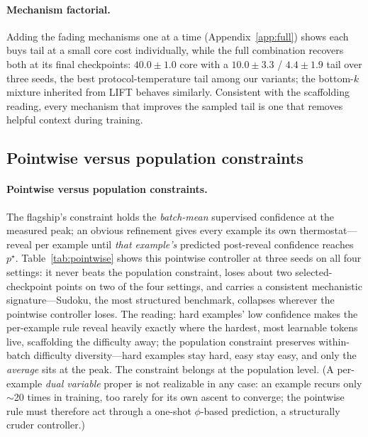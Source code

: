 \documentclass{article} %
\begin{document}
\paragraph{Mechanism factorial.} Adding the fading mechanisms one at a time (Appendix~\ref{app:full}) shows each buys tail at a small core cost individually, while the full combination recovers both at its final checkpoints: $40.0 \pm 1.0$ core with a $10.0 \pm 3.3$ / $4.4 \pm 1.9$ tail over three seeds, the best protocol-temperature tail among our variants; the bottom-$k$ mixture inherited from LIFT behaves similarly. Consistent with the scaffolding reading, every mechanism that improves the sampled tail is one that removes helpful context during training.

\subsection*{Pointwise versus population constraints}
\paragraph{Pointwise versus population constraints.} The flagship's constraint holds the \emph{batch-mean} supervised confidence at the measured peak; an obvious refinement gives every example its own thermostat---reveal per example until \emph{that example's} predicted post-reveal confidence reaches $p^\star$. Table~\ref{tab:pointwise} shows this pointwise controller at three seeds on all four settings: it never beats the population constraint, loses about two selected-checkpoint points on two of the four settings, and carries a consistent mechanistic signature---Sudoku, the most structured benchmark, collapses wherever the pointwise controller loses. The reading: hard examples' low confidence makes the per-example rule reveal heavily exactly where the hardest, most learnable tokens live, scaffolding the difficulty away; the population constraint preserves within-batch difficulty diversity---hard examples stay hard, easy stay easy, and only the \emph{average} sits at the peak. The constraint belongs at the population level. (A per-example \emph{dual variable} proper is not realizable in any case: an example recurs only $\sim$20 times in training, too rarely for its own ascent to converge; the pointwise rule must therefore act through a one-shot $\phi$-based prediction, a structurally cruder controller.)
\end{document}
